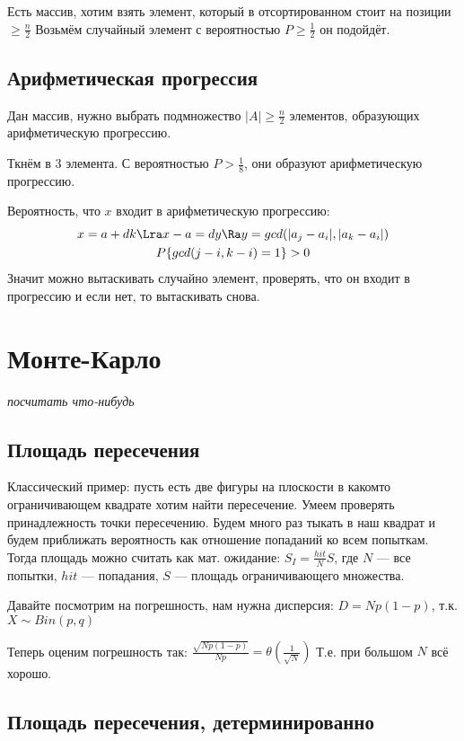 Есть массив, хотим взять элемент, который в отсортированном стоит на позиции $\geq \frac{n}{2}$
Возьмём случайный элемент с вероятностью $P \geq \frac{1}{2}$ он подойдёт.

\subsection{Арифметическая прогрессия}
Дан массив, нужно выбрать подмножество $|A| \geq \frac{n}{2}$ элементов, образующих
арифметическую прогрессию.

Ткнём в 3 элемента. С вероятностью $P > \frac{1}{8}$, они образуют арифметическую прогрессию.

Вероятность, что $x$ входит в арифметическую прогрессию: 
\begin{gather*}
    x = a + dk \Lra x-a = dy \Ra y = gcd(|a_j - a_i|, |a_k - a_i|) \\
    P \{ gcd(j-i, k-i) = 1 \} > 0
\end{gather*}
Значит можно вытаскивать случайно элемент, проверять, что он входит в прогрессию и если
нет, то вытаскивать снова.

\section{Монте-Карло}

\textit{посчитать что-нибудь}

\subsection{Площадь пересечения}

Классический пример: пусть есть две фигуры на плоскости в какомто ограничивающем квадрате
хотим найти пересечение. Умеем проверять принадлежность точки пересечению.
Будем много раз тыкать в наш квадрат и будем приближать вероятность как отношение
попаданий ко всем попыткам. Тогда площадь можно считать как мат. ожидание:
$S_I = \frac{hit}{N} S$, где $N$ --- все попытки, $hit$ --- попадания, $S$ --- площадь 
ограничивающего множества.

Давайте посмотрим на погрешность, нам нужна дисперсия: $D = Np(1-p)$, т.к. $X\sim Bin(p, q)$

Теперь оценим погрешность так: $\frac{\sqrt{Np(1-p)}}{Np} = \theta(\frac{1}{\sqrt{N}})$
Т.е. при большом $N$ всё хорошо.

\subsection{Площадь пересечения, детерминированно}


